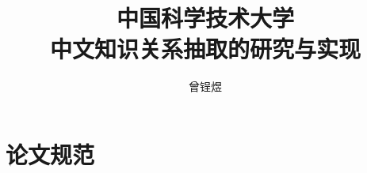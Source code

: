 \documentclass[bachelor]{ustcthesis}
\title{中国科学技术大学\\中文知识关系抽取的研究与实现}
\author{曾锃煜}
\begin{document}
\maketitle

%
%
%

\frontmatter

\tableofcontents
\listoffigures
\listoftables
\listofalgorithms  %


\mainmatter










\appendix
\chapter{论文规范}
\end{document}
